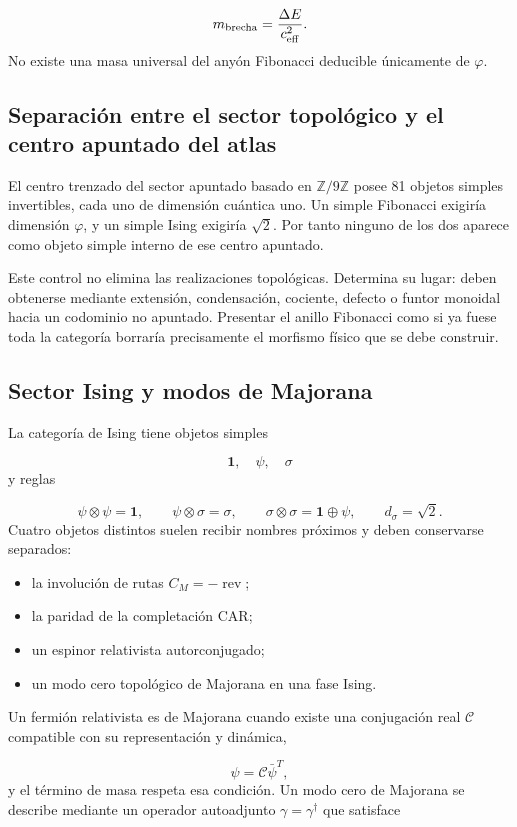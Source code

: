 \[
m_{\rm brecha}=\frac{\Delta E}{c_{\rm eff}^{2}}.
\]
No existe una masa universal del anyón Fibonacci deducible únicamente de \(\varphi\).

\subsection{Separación entre el sector topológico y el centro apuntado del atlas}
El centro trenzado del sector apuntado basado en \(\mathbb Z/9\mathbb Z\) posee 81 objetos simples invertibles, cada uno de dimensión cuántica uno. Un simple Fibonacci exigiría dimensión \(\varphi\), y un simple Ising exigiría \(\sqrt2\). Por tanto ninguno de los dos aparece como objeto simple interno de ese centro apuntado.

Este control no elimina las realizaciones topológicas. Determina su lugar: deben obtenerse mediante extensión, condensación, cociente, defecto o funtor monoidal hacia un codominio no apuntado. Presentar el anillo Fibonacci como si ya fuese toda la categoría borraría precisamente el morfismo físico que se debe construir.

\subsection{Sector Ising y modos de Majorana}
La categoría de Ising tiene objetos simples

\[
\mathbf1,\quad\psi,\quad\sigma
\]
y reglas

\[
\psi\otimes\psi=\mathbf1,
\qquad
\psi\otimes\sigma=\sigma,
\qquad
\sigma\otimes\sigma=\mathbf1\oplus\psi,
\qquad
d_\sigma=\sqrt2.
\]
Cuatro objetos distintos suelen recibir nombres próximos y deben conservarse separados:

\begin{itemize}
\item la involución de rutas \(C_M=-\operatorname{rev}\);
\item la paridad de la completación CAR;
\item un espinor relativista autorconjugado;
\item un modo cero topológico de Majorana en una fase Ising.
\end{itemize}
Un fermión relativista es de Majorana cuando existe una conjugación real \(\mathcal C\) compatible con su representación y dinámica,

\[
\psi=\mathcal C\bar\psi^{T},
\]
y el término de masa respeta esa condición. Un modo cero de Majorana se describe mediante un operador autoadjunto \(\gamma=\gamma^\dagger\) que satisface

